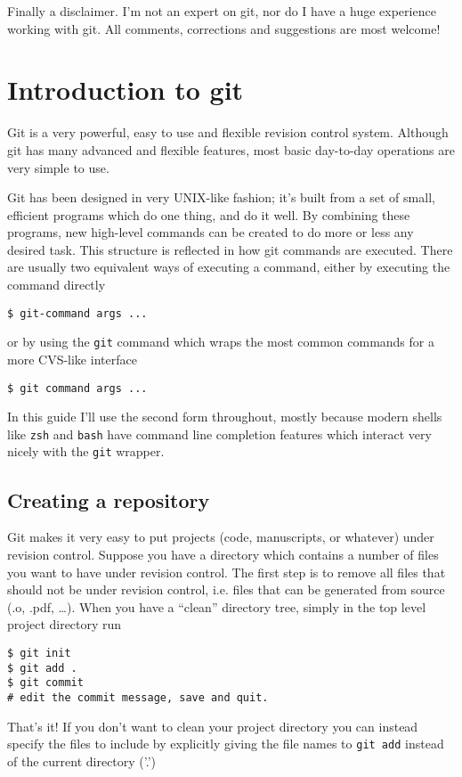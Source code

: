 \documentclass[a4paper,10pt]{article}
\begin{document}
Finally a disclaimer. I'm not an expert on git, nor do I have a huge
experience working with git. All comments, corrections and suggestions are 
most welcome!

\section{Introduction to git}
Git is a very powerful, easy to use and flexible revision control system.
Although git has many advanced and flexible features, most basic  day-to-day
operations are very simple to use. 

Git has been designed in very UNIX-like fashion; it's built from a set of
small, efficient programs which do one thing, and do it well. By combining
these programs, new high-level commands can be created to do more or less any
desired task. This structure is reflected in how git commands are executed.
There are usually two equivalent ways of executing a command, either by
executing the command directly
\begin{verbatim}
$ git-command args ...
\end{verbatim}
or by using the \texttt{git} command which wraps the most common commands for a
more CVS-like interface
\begin{verbatim}
$ git command args ...
\end{verbatim}
In this guide I'll use the second form throughout, mostly because modern
shells like \texttt{zsh} and \texttt{bash} have command line
completion features which interact very nicely with the \texttt{git} wrapper.

\subsection{Creating a repository}
Git makes it very easy to put projects (code, manuscripts, or whatever) under
revision control. Suppose you have a directory which contains a number of
files you want to have under revision control. The first step is to remove all
files that should not be under revision control, i.e. files that can be
generated from source (.o, .pdf, \ldots). When you have a ``clean'' directory
tree, simply in the top level project directory run
\begin{verbatim}
$ git init
$ git add .
$ git commit
# edit the commit message, save and quit.
\end{verbatim}
That's it! 
If you don't want to clean your project directory
you can instead specify the files to include by explicitly giving the file
names to \texttt{git add} instead of the current directory ('.')
\end{document}
